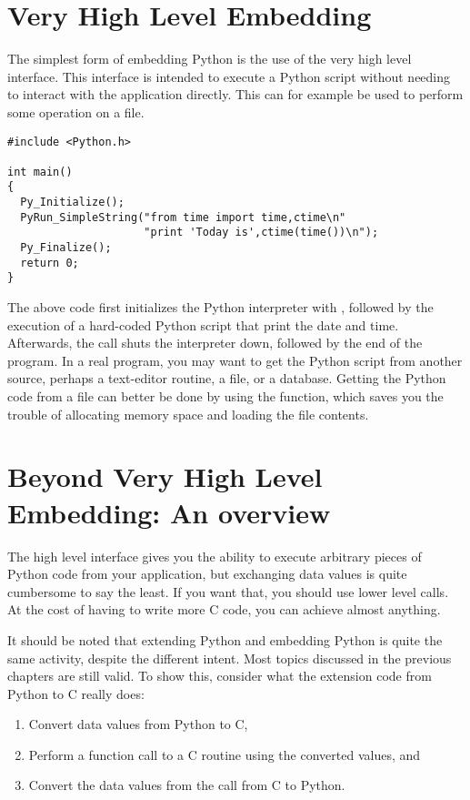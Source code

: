 \section{Very High Level Embedding
         \label{high-level-embedding}}

The simplest form of embedding Python is the use of the very
high level interface. This interface is intended to execute a
Python script without needing to interact with the application
directly. This can for example be used to perform some operation
on a file.

\begin{verbatim}
#include <Python.h>

int main()
{
  Py_Initialize();
  PyRun_SimpleString("from time import time,ctime\n"
                     "print 'Today is',ctime(time())\n");
  Py_Finalize();
  return 0;
}
\end{verbatim}

The above code first initializes the Python interpreter with
, followed by the execution of a hard-coded
Python script that print the date and time.  Afterwards, the
 call shuts the interpreter down, followed by
the end of the program.  In a real program, you may want to get the
Python script from another source, perhaps a text-editor routine, a
file, or a database.  Getting the Python code from a file can better
be done by using the  function, which
saves you the trouble of allocating memory space and loading the file
contents.


\section{Beyond Very High Level Embedding: An overview
         \label{lower-level-embedding}}

The high level interface gives you the ability to execute
arbitrary pieces of Python code from your application, but
exchanging data values is quite cumbersome to say the least. If
you want that, you should use lower level calls. At the cost of
having to write more C code, you can achieve almost anything.

It should be noted that extending Python and embedding Python
is quite the same activity, despite the different intent. Most
topics discussed in the previous chapters are still valid. To
show this, consider what the extension code from Python to C
really does:

\begin{enumerate}
    \item Convert data values from Python to C,
    \item Perform a function call to a C routine using the
        converted values, and
    \item Convert the data values from the call from C to Python.
\end{enumerate}

